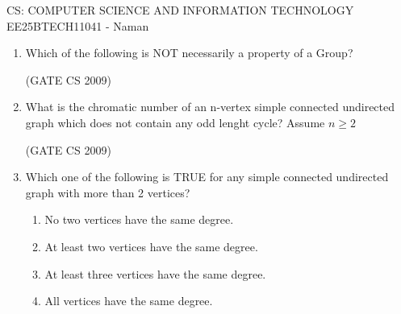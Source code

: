 \documentclass[a4paper, 11pt]{article}
\begin{document}
\begin{center}
    \huge{CS: COMPUTER SCIENCE AND INFORMATION TECHNOLOGY}\\
    \large{EE25BTECH11041 - Naman}
\end{center}

\begin{enumerate}
    \item Which of the following is NOT necessarily a property of a Group?\\
    \begin{enumerate}
    \end{enumerate}
    

    \hfill (GATE CS 2009)
    
    \item What is the chromatic number of an n-vertex simple connected undirected graph which does not contain any odd lenght cycle? Assume $n \geq 2$\\
    \begin{enumerate}
    \end{enumerate}

    \hfill (GATE CS 2009)

    \item Which one of the following is TRUE for any simple connected undirected graph with more than 2 vertices?
    \begin{enumerate}
        \item No two vertices have the same degree.
        \item At least two vertices have the same degree.
        \item At least three vertices have the same degree.
        \item All vertices have the same degree.
    \end{enumerate}


\end{enumerate}
\end{document}

